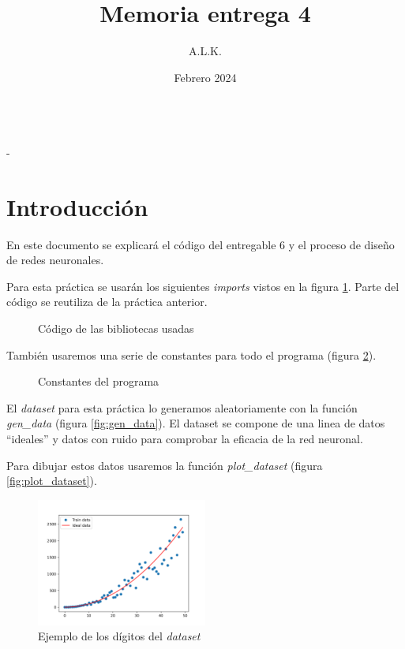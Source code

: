\documentclass[6pt]{AiTex}
\title{Memoria entrega 4}
\author{A.L.K.}
\date{Febrero 2024}
\begin{document}
\justify

\begin{center}

    {\huge \textbf{\underline{\subtitulo}}} \\
    { \lesson - \autor}

\end{center}


\section*{Introducción}

En este documento se explicará el código del entregable 6 y el proceso de diseño de redes neuronales.

Para esta práctica se usarán los siguientes \textit{imports} vistos en la figura \ref{fig:imports}. Parte del código se reutiliza de la práctica anterior.
\begin{figure}[H]
    \centering
    
    \caption{Código de las bibliotecas usadas}
    \label{fig:imports}
\end{figure}

También usaremos una serie de constantes para todo el programa (figura \ref{fig:constants}).

\begin{figure}[H]
    \centering
    
    \caption{Constantes del programa}
    \label{fig:constants}
\end{figure}

El \textit{dataset} para esta práctica lo generamos aleatoriamente con la función \textit{gen\_data} (figura \ref{fig:gen_data}). El dataset se compone de una linea de datos ``ideales'' y datos con ruido para comprobar la eficacia de la red neuronal.

Para dibujar estos datos usaremos la función \textit{plot\_dataset} (figura \ref{fig:plot_dataset}).

\begin{figure}[H]
    \centering
    \includegraphics[width=0.5\textwidth]{./images/dataset.png}
    \caption{Ejemplo de los dígitos del \textit{dataset}}
    \label{fig:digitos}
\end{figure}
\end{document}
